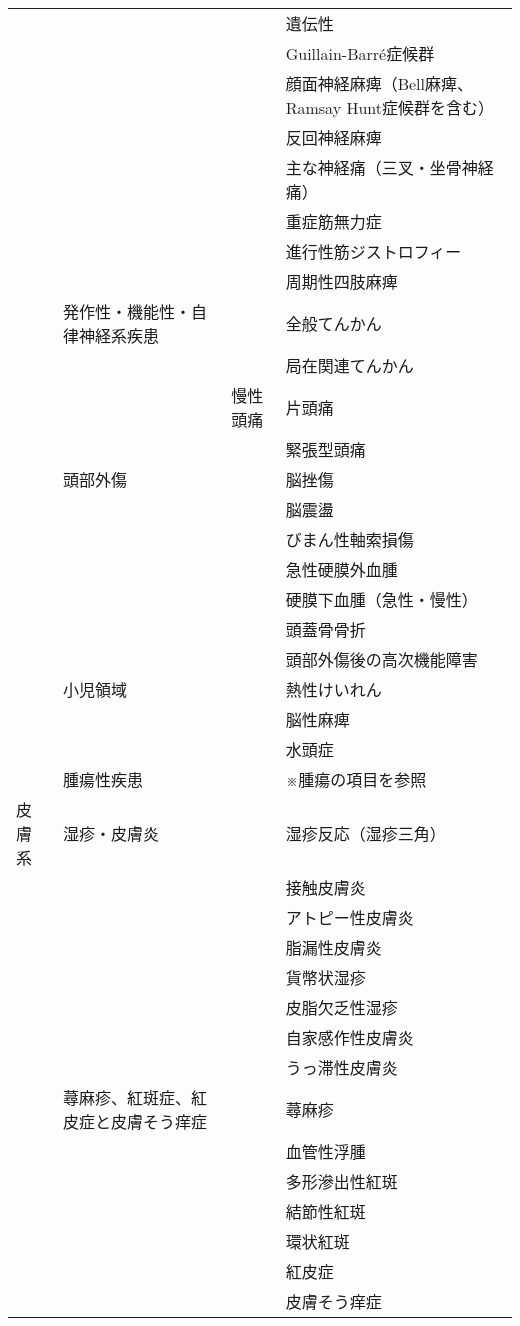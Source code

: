 \begin{xltabular}{\linewidth}{XXXX}
 &  &  & 遺伝性 \\
 &  &  & Guillain-Barré症候群 \\
 &  &  & 顔面神経麻痺（Bell麻痺、Ramsay Hunt症候群を含む） \\
 &  &  & 反回神経麻痺 \\
 &  &  & 主な神経痛（三叉・坐骨神経痛） \\
 &  &  & 重症筋無力症 \\
 &  &  & 進行性筋ジストロフィー \\
 &  &  & 周期性四肢麻痺 \\
 & 発作性・機能性・自律神経系疾患 &  & 全般てんかん \\
 &  &  & 局在関連てんかん \\
 &  & 慢性頭痛 & 片頭痛 \\
 &  &  & 緊張型頭痛 \\
 & 頭部外傷 &  & 脳挫傷 \\
 &  &  & 脳震盪 \\
 &  &  & びまん性軸索損傷 \\
 &  &  & 急性硬膜外血腫 \\
 &  &  & 硬膜下血腫（急性・慢性） \\
 &  &  & 頭蓋骨骨折 \\
 &  &  & 頭部外傷後の高次機能障害 \\
 & 小児領域 &  & 熱性けいれん \\
 &  &  & 脳性麻痺 \\
 &  &  & 水頭症 \\
 & 腫瘍性疾患 &  & ※腫瘍の項目を参照 \\
皮膚系 & 湿疹・皮膚炎 &  & 湿疹反応（湿疹三角） \\
 &  &  & 接触皮膚炎 \\
 &  &  & アトピー性皮膚炎 \\
 &  &  & 脂漏性皮膚炎 \\
 &  &  & 貨幣状湿疹 \\
 &  &  & 皮脂欠乏性湿疹 \\
 &  &  & 自家感作性皮膚炎 \\
 &  &  & うっ滞性皮膚炎 \\
 & 蕁麻疹、紅斑症、紅皮症と皮膚そう痒症 &  & 蕁麻疹 \\
 &  &  & 血管性浮腫 \\
 &  &  & 多形滲出性紅斑 \\
 &  &  & 結節性紅斑 \\
 &  &  & 環状紅斑 \\
 &  &  & 紅皮症 \\
 &  &  & 皮膚そう痒症 \\

\end{xltabular}
